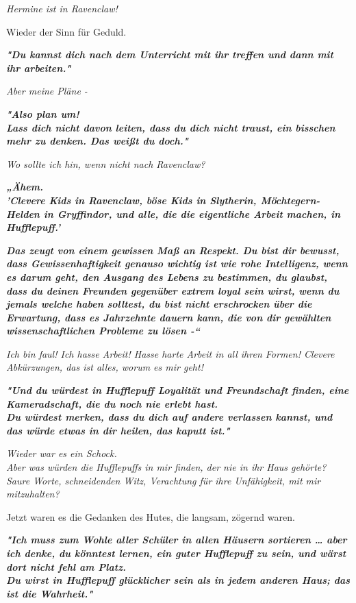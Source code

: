 {\emph{Hermine ist in Ravenclaw!}

Wieder der Sinn für Geduld.

\textbf{\emph{"Du kannst dich nach dem Unterricht mit ihr treffen und dann mit ihr arbeiten."}}

\emph{Aber meine Pläne -}

\textbf{\emph{"Also plan um!}}\\ \textbf{\emph{Lass dich nicht davon leiten, dass du dich nicht traust, ein bisschen mehr zu denken. Das weißt du doch."}}

\emph{Wo sollte ich hin, wenn nicht nach Ravenclaw?}

\textbf{\emph{„Ähem.\\ 'Clevere Kids in Ravenclaw, böse Kids in Slytherin, Möchtegern-Helden in Gryffindor, und alle, die die eigentliche Arbeit machen, in Hufflepuff.'}}

\textbf{\emph{Das zeugt von einem gewissen Maß an Respekt. Du bist dir bewusst, dass Gewissenhaftigkeit genauso wichtig ist wie rohe Intelligenz, wenn es darum geht, den Ausgang des Lebens zu bestimmen, du glaubst, dass du deinen Freunden gegenüber extrem loyal sein wirst, wenn du jemals welche haben solltest, du bist nicht erschrocken über die Erwartung, dass es Jahrzehnte dauern kann, die von dir gewählten wissenschaftlichen Probleme zu lösen -“}}

\emph{Ich bin faul! Ich hasse Arbeit! Hasse harte Arbeit in all ihren Formen! Clevere Abkürzungen, das ist alles, worum es mir geht!}

\textbf{\emph{"Und du würdest in Hufflepuff Loyalität und Freundschaft finden, eine Kameradschaft, die du noch nie erlebt hast.\\ Du würdest merken, dass du dich auf andere verlassen kannst, und das würde etwas in dir heilen, das kaputt ist."}}

\emph{Wieder war es ein Schock.\\ Aber was würden die Hufflepuffs in mir finden, der nie in ihr Haus gehörte? Saure Worte, schneidenden Witz, Verachtung für ihre Unfähigkeit, mit mir mitzuhalten?}

Jetzt waren es die Gedanken des Hutes, die langsam, zögernd waren.

\textbf{\emph{"Ich muss zum Wohle aller Schüler in allen Häusern sortieren … aber ich denke, du könntest lernen, ein guter Hufflepuff zu sein, und wärst dort nicht fehl am Platz.\\ Du wirst in Hufflepuff glücklicher sein als in jedem anderen Haus; das ist die Wahrheit."}}

}
